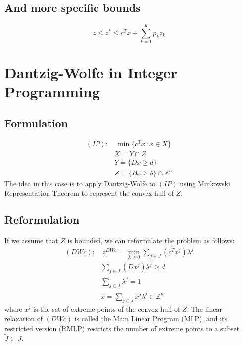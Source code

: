 \documentclass[12pt, openany]{report}
\theoremstyle{definition}
\begin{document}
\subsection{And more specific bounds}
\begin{equation}
	z \le z^* \le c^Tx + \sum_{k=1}^K p_k z_k
\end{equation}
\section{Dantzig-Wolfe in Integer Programming}
\subsection{Formulation}
\begin{equation}
	\begin{aligned}
		(IP): &\ \min\{c^Tx \ : x\in X\}\\
		&X = Y\cap Z\\
		&Y = \{Dx\ge d\}\\
		&Z = \{Bx\ge b\} \cap \mathbb{Z}^n
	\end{aligned}
\end{equation}
The idea in this case is to apply Dantzig-Wolfe to $(IP)$ using Minkowski Representation Theorem to represent the convex hull of $Z$. 
\subsection{Reformulation}
If we assume that $Z$ is bounded, we can reformulate the problem as follows:
\begin{equation}\label{eq:mlp}
	\begin{aligned}
		(DWc): &\ z^{DWc} = \min_{\lambda \ge 0} \sum_{j\in J}(c^Tx^j)\lambda^j\\
		& \sum_{j\in J}(Dx^j)\lambda^j \ge d\\
		& \sum_{j\in J}\lambda^j = 1\\
		& x = \sum_{j\in J}x^j\lambda^j \in \mathbb{Z}^n
	\end{aligned}
\end{equation}
where $x^j$ is the set of extreme points of the convex hull of $Z$. The linear relaxation of $(DWc)$ is called the Main Linear Program (MLP), and its restricted version (RMLP) restricts the number of extreme points to a subset $\tilde J \subseteq J$. 
\end{document}
